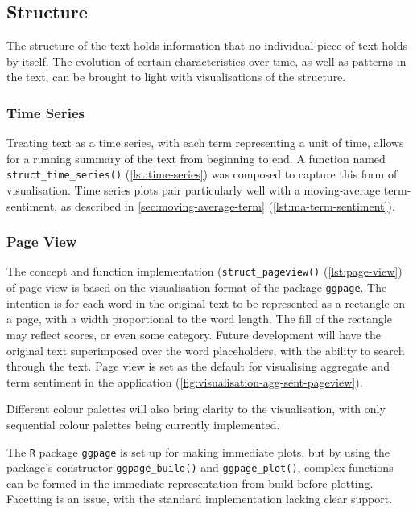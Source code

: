 \documentclass[11pt, a4paper, titlepage]{report}
\begin{document}
\subsection{Structure}\label{sec:structure}

The structure of the text holds information that no individual piece
of text holds by itself. The evolution of certain characteristics over
time, as well as patterns in the text, can be brought to light with
visualisations of the structure.

\subsubsection{Time Series}\label{sec:time-series}

Treating text as a time series, with each term representing a unit of
time, allows for a running summary of the text from beginning to end.
A function named \texttt{struct_time_series()}
(\underline{\cref{lst:time-series}}) was composed to capture this form
of visualisation. Time series plots pair particularly well with a
moving-average term-sentiment, as described in
\underline{\cref{sec:moving-average-term}}
(\underline{\cref{lst:ma-term-sentiment}}).

\subsubsection{Page View}\label{sec:page-view}

The concept and function implementation
(\texttt{struct_pageview()} (\underline{\cref{lst:page-view}})
of page view is based on the visualisation format of the package
\texttt{ggpage}. The intention is for each word in the original text to be
represented as a rectangle on a page, with a width proportional to the
word length. The fill of the rectangle may reflect scores, or even
some category. Future development will have the original text
superimposed over the word placeholders, with the ability to search
through the text. Page view is set as the default for visualising
aggregate and term sentiment in the application
(\underline{\cref{fig:visualisation-agg-sent-pageview}}).

Different colour palettes will also bring clarity to the
visualisation, with only sequential colour palettes being currently
implemented.

The \texttt{R} package \texttt{ggpage} is set up for making immediate
plots, but by using the package's constructor
\texttt{ggpage_build()} and \texttt{ggpage_plot()},
complex functions can be formed in the immediate representation from
build before plotting\autocite{hvitfeldt19ggpage}. Facetting is an
issue, with the standard implementation lacking clear support.
\end{document}
